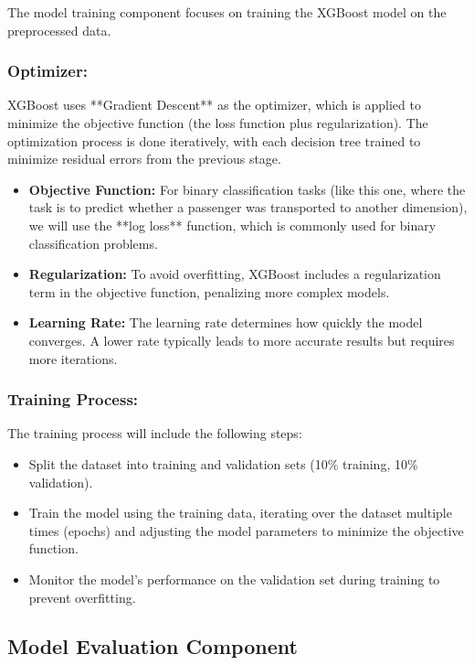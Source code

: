 \documentclass[15pt]{article}
\begin{document}
The model training component focuses on training the XGBoost model on the preprocessed data.

\subsubsection{Optimizer:}

XGBoost uses **Gradient Descent** as the optimizer, which is applied to minimize the objective function (the loss function plus regularization). The optimization process is done iteratively, with each decision tree trained to minimize residual errors from the previous stage.

\begin{itemize}
    \item \textbf{Objective Function:} For binary classification tasks (like this one, where the task is to predict whether a passenger was transported to another dimension), we will use the **log loss** function, which is commonly used for binary classification problems.
    \item \textbf{Regularization:} To avoid overfitting, XGBoost includes a regularization term in the objective function, penalizing more complex models.
    \item \textbf{Learning Rate:} The learning rate determines how quickly the model converges. A lower rate typically leads to more accurate results but requires more iterations.
\end{itemize}

\subsubsection{Training Process:}

The training process will include the following steps:
\begin{itemize}
    \item Split the dataset into training and validation sets (10\% training, 10\% validation).
    \item Train the model using the training data, iterating over the dataset multiple times (epochs) and adjusting the model parameters to minimize the objective function.
    \item Monitor the model’s performance on the validation set during training to prevent overfitting.
\end{itemize}

\subsection{Model Evaluation Component}
\end{document}
